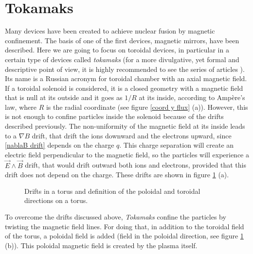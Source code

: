 \documentclass[a4paper,12pt,oneside]{book}
\begin{document}
\section{Tokamaks}
\label{sec_tokamaks}
Many devices have been created to achieve nuclear fusion by magnetic confinement. The basis of one of the first devices, magnetic mirrors, have been described. Here we are going to focus on toroidal devices, in particular in a certain type of devices called \textit{tokamaks} \cite{Wesson, Miyamoto} (for a more divulgative, yet formal and descriptive point of view, it is highly recommended to see the series of articles \cite{Sertok1, Sertok2, Sertok3, Sertok4}). Its name is a Russian acronym for toroidal chamber with an axial magnetic field. If a toroidal solenoid is considered, it is a closed geometry with a magnetic field that is null at its outside and it goes as $1/R$ at its inside, according to Ampère's law, where $R$ is the radial coordinate (see figure \ref{coord y flux} (a)). However, this is not enough to confine particles inside the solenoid because of the drifts described previously. The non-uniformity of the magnetic field at its inside leads to a  $\nabla B$ drift, that drift the ions downward and the electrons upward, since \eqref{nablaB drift} depends on the charge $q$. This charge separation will create an electric field perpendicular to the magnetic field, so the particles will experience a $\vec{E} \wedge \vec{B}$ drift, that would drift outward both ions and electrons, provided that this drift does not depend on the charge. These drifts are shown in  figure \ref{fig drifts torus} (a).

\begin{figure}[htbp]
\centering
{}
\hfill
{}
\caption{Drifts in a torus and definition of the poloidal and toroidal directions on a torus.}
\label{fig drifts torus}
\end{figure}



To overcome the drifts discussed above, \textit{Tokamaks} confine the particles by twisting the magnetic field lines. For doing that, in addition to the toroidal field of the torus, a poloidal field is added (field in the poloidal direction, see figure \ref{fig drifts torus} (b)). This poloidal magnetic field is created by the plasma itself. 
\end{document}
